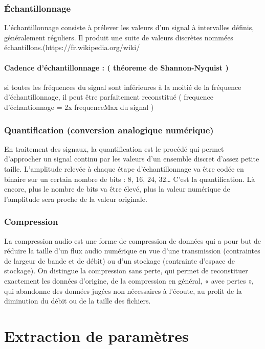 \documentclass[a4paper, 12pt]{book}
\begin{document}
\subsection{Échantillonnage}

L'échantillonnage consiste à prélever les valeurs d'un signal à intervalles définis, généralement réguliers. Il produit une suite de valeurs discrètes nommées échantillons.(https://fr.wikipedia.org/wiki/%

\subsubsection{Cadence d'échantillonnage : ( théoreme de Shannon-Nyquist )}

si toutes les fréquences du signal sont inférieures à la moitié de la fréquence d'échantillonnage, il peut être parfaitement reconstitué ( frequence d’échantionnage = 2x frequenceMax du signal )

\subsection{Quantification (conversion analogique numérique)}
En traitement des signaux, la quantification est le procédé qui permet d'approcher un signal continu par les valeurs d'un ensemble discret d'assez petite taille. L’amplitude relevée à chaque étape d’échantillonnage va être codée en binaire sur un certain nombre de bits : 8, 16, 24, 32… C’est la quantification. Là encore, plus le nombre de bits va être élevé, plus la valeur numérique de l’amplitude sera proche de la valeur originale.

\subsection{Compression}
La compression audio est une forme de compression de données qui a pour but de réduire la taille d'un flux audio numérique en vue d'une transmission (contraintes de largeur de bande et de débit) ou d'un stockage (contrainte d'espace de stockage). On distingue la compression sans perte, qui permet de reconstituer exactement les données d'origine, de la compression en général, « avec pertes », qui abandonne des données jugées non nécessaires à l'écoute, au profit de la diminution du débit ou de la taille des fichiers. 


\chapter{Extraction de paramètres}
\end{document}
